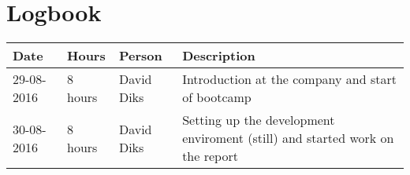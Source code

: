 \chapter{Logbook}
\begin{tabular}{|l|l|l|l|}
	\hline
	\textbf{Date} & \textbf{Hours} & \textbf{Person} & \textbf{Description} \\
	\hline
	29-08-2016 & 8 hours & David Diks & Introduction at the company and start of bootcamp \\ \hline
	30-08-2016 & 8 hours & David Diks & Setting up the development enviroment (still) and started work on the report \\ \hline
\end{tabular}